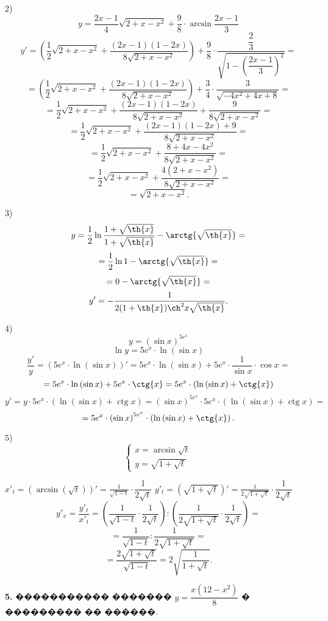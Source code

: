 \documentclass{article}
\begin{document}
2) $$y=\dfrac{2x-1}{4}\sqrt{2+x-x^2}+\dfrac{9}{8}\cdot\arcsin{\dfrac{2x-1}{3}} $$
$$y'=(\dfrac{1}{2}\sqrt{2+x-x^2}+\dfrac{(2x-1)(1-2x)}{8\sqrt{2+x-x^2}})+\dfrac{9}{8}\cdot\dfrac{\dfrac{2}{3}}{\sqrt{1-(\dfrac{2x-1}{3})^2}}= $$
$$=(\dfrac{1}{2}\sqrt{2+x-x^2}+\dfrac{(2x-1)(1-2x)}{8\sqrt{2+x-x^2}})+\dfrac{3}{4}\cdot\dfrac{3}{\sqrt{-4x^2+4x+8}}= $$
$$=\dfrac{1}{2}\sqrt{2+x-x^2}+\dfrac{(2x-1)(1-2x)}{8\sqrt{2+x-x^2}}+\dfrac{9}{8\sqrt{2+x-x^2}}= $$
$$=\dfrac{1}{2}\sqrt{2+x-x^2}+\dfrac{(2x-1)(1-2x)+9}{8\sqrt{2+x-x^2}}= $$
$$=\dfrac{1}{2}\sqrt{2+x-x^2}+\dfrac{8+4x-4x^2}{8\sqrt{2+x-x^2}}= $$
$$=\dfrac{1}{2}\sqrt{2+x-x^2}+\dfrac{4(2+x-x^2)}{8\sqrt{2+x-x^2}}= $$
$$=\sqrt{2+x-x^2}. $$

3)
$$y=\dfrac{1}{2}\ln{\dfrac{1+\sqrt{\th{x}}}{1+\sqrt{\th{x}}}-\arctg{\sqrt{\th{x}}}}= $$
$$=\dfrac{1}{2}\ln{1}-\arctg{\sqrt{\th{x}}}= $$
$$=0-\arctg{\sqrt{\th{x}}}= $$
$$y'=-\dfrac{1}{2(1+\th{x})\ch^2{x}\sqrt{\th{x}}}.$$

4)
$$y=\left(\sin{x} \right)^{5e^x}$$
$$\ln{y}=5e^x\cdot \ln{\left(\sin{x} \right)}$$
$$\dfrac{y'}{y}=\left(5e^x\cdot \ln{\left(\sin{x} \right)}\right)'=5e^x\cdot \ln{\left(\sin{x} \right)}+5e^x\cdot \dfrac{1}{\sin{x}}\cdot \cos{x} = $$
$$ = 5e^x\cdot \ln{\left(\sin{x} \right)}+5e^x\cdot \ctg{x} = 5e^{x}\cdot\left(\ln{\left(\sin{x} \right)}+\ctg{x}\right) $$
$$y'=y\cdot 5e^{x}\cdot\left(\ln{\left(\sin{x} \right)}+\operatorname{ctg}{x}\right) = \left(\sin{x} \right)^{5e^x}\cdot 5e^{x}\cdot\left(\ln{\left(\sin{x} \right)}+\operatorname{ctg}{x}\right) =$$
$$= 5e^{x}\cdot \left(\sin{x} \right)^{5e^x}\cdot \left(\ln{\left(\sin{x} \right)}+\ctg{x}\right).$$

5)
$$\begin{cases} 
x=\arcsin{\sqrt{t}}\\ 
y=\sqrt{1+\sqrt{t}}\end{cases} $$

$x'_{t}=(\arcsin{(\sqrt{t})})' = \frac{1}{\sqrt{1-t}}\cdot\dfrac{1}{2\sqrt{t}}$
$y'_{t}=(\sqrt{1+\sqrt{t}})' = \frac{1}{2\sqrt{1+\sqrt{t}}}\cdot\dfrac{1}{2\sqrt{t}} $
$$y'_{x}=\frac{y'_{t}}{x'_{t}} = (\frac{1}{\sqrt{1-t}}\cdot\dfrac{1}{2\sqrt{t}}):(\frac{1}{2\sqrt{1+\sqrt{t}}}\cdot\dfrac{1}{2\sqrt{t}})= $$
$$ = \frac{1}{\sqrt{1-t}}:\frac{1}{2\sqrt{1+\sqrt{t}}}=$$ $$=\frac{2\sqrt{1+\sqrt{t}}}{\sqrt{1-t}} = 2\sqrt{\frac{1}{1+\sqrt{t}}}.$$

\textbf{5.} ����������� ������� $y=\dfrac{x(12-x^2)}{8}$ � ��������� �� ������.
\end{document}

